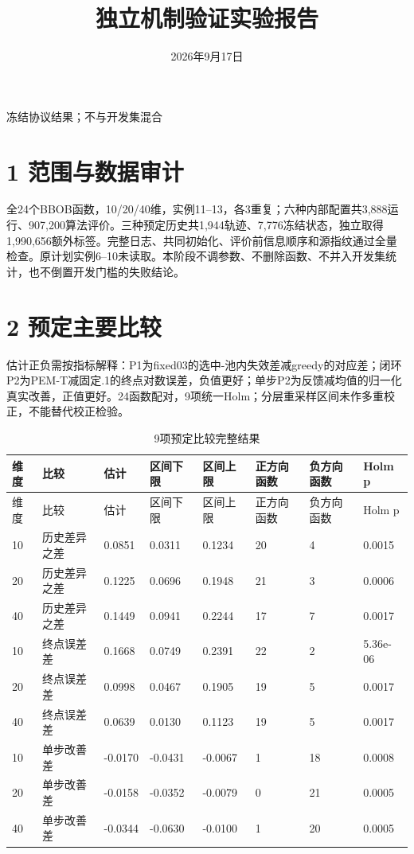 \documentclass[11pt,a4paper]{article}
\title{独立机制验证实验报告}
\author{}
\date{2026年9月17日}
\begin{document}
\maketitle
\begin{center}冻结协议结果；不与开发集混合\end{center}
\hypertarget{ux8303ux56f4ux4e0eux6570ux636eux5ba1ux8ba1}{%
\section{1
范围与数据审计}\label{ux8303ux56f4ux4e0eux6570ux636eux5ba1ux8ba1}}

全24个BBOB函数，10/20/40维，实例11--13，各3重复；六种内部配置共3,888运行、907,200算法评价。三种预定历史共1,944轨迹、7,776冻结状态，独立取得1,990,656额外标签。完整日志、共同初始化、评价前信息顺序和源指纹通过全量检查。原计划实例6--10未读取。本阶段不调参数、不删除函数、不并入开发集统计，也不倒置开发门槛的失败结论。

\hypertarget{ux9884ux5b9aux4e3bux8981ux6bd4ux8f83}{%
\section{2 预定主要比较}\label{ux9884ux5b9aux4e3bux8981ux6bd4ux8f83}}

估计正负需按指标解释：P1为fixed03的选中-池内失效差减greedy的对应差；闭环P2为PEM-T减固定.1的终点对数误差，负值更好；单步P2为反馈减均值的归一化真实改善，正值更好。24函数配对，9项统一Holm；分层重采样区间未作多重校正，不能替代校正检验。

\par\noindent\begin{minipage}{\linewidth}

\begin{longtable}[]{@{}llllllll@{}}
\caption{9项预定比较完整结果}\tabularnewline
\toprule
维度 & 比较 & 估计 & 区间下限 & 区间上限 & 正方向函数 & 负方向函数 &
Holm p \\
\midrule
\endfirsthead
\toprule
维度 & 比较 & 估计 & 区间下限 & 区间上限 & 正方向函数 & 负方向函数 &
Holm p \\
\midrule
\endhead
10 & 历史差异之差 & 0.0851 & 0.0311 & 0.1234 & 20 & 4 & 0.0015 \\
20 & 历史差异之差 & 0.1225 & 0.0696 & 0.1948 & 21 & 3 & 0.0006 \\
40 & 历史差异之差 & 0.1449 & 0.0941 & 0.2244 & 17 & 7 & 0.0017 \\
10 & 终点误差差 & 0.1668 & 0.0749 & 0.2391 & 22 & 2 & 5.36e-06 \\
20 & 终点误差差 & 0.0998 & 0.0467 & 0.1905 & 19 & 5 & 0.0017 \\
40 & 终点误差差 & 0.0639 & 0.0130 & 0.1123 & 19 & 5 & 0.0017 \\
10 & 单步改善差 & -0.0170 & -0.0431 & -0.0067 & 1 & 18 & 0.0008 \\
20 & 单步改善差 & -0.0158 & -0.0352 & -0.0079 & 0 & 21 & 0.0005 \\
40 & 单步改善差 & -0.0344 & -0.0630 & -0.0100 & 1 & 20 & 0.0005 \\
\bottomrule
\end{longtable}

\end{minipage}\par
\end{document}
